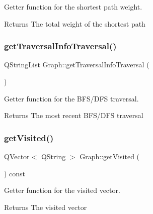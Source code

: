 Getter function for the shortest path weight. 

\begin{DoxyReturn}{Returns}
The total weight of the shortest path 
\end{DoxyReturn}
\mbox{\label{class_graph_a27674fdc8baef9afe7406f067d56137c}} 
\subsubsection{\texorpdfstring{get\+Traversal\+Info\+Traversal()}{getTraversalInfoTraversal()}}
{\footnotesize\ttfamily Q\+String\+List Graph\+::get\+Traversal\+Info\+Traversal (\begin{DoxyParamCaption}{ }\end{DoxyParamCaption})}



Getter function for the B\+F\+S/\+D\+FS traversal. 

\begin{DoxyReturn}{Returns}
The most recent B\+F\+S/\+D\+FS traversal 
\end{DoxyReturn}
\mbox{\label{class_graph_a92dd89f52ca03428afe90a3ee99ece1e}} 
\subsubsection{\texorpdfstring{get\+Visited()}{getVisited()}}
{\footnotesize\ttfamily Q\+Vector$<$ Q\+String $>$ Graph\+::get\+Visited (\begin{DoxyParamCaption}{ }\end{DoxyParamCaption}) const}



Getter function for the visited vector. 

\begin{DoxyReturn}{Returns}
The visited vector 
\end{DoxyReturn}
\mbox{\label{class_graph_a82253781b5b51b8a91db5adbc7e96367}} 
